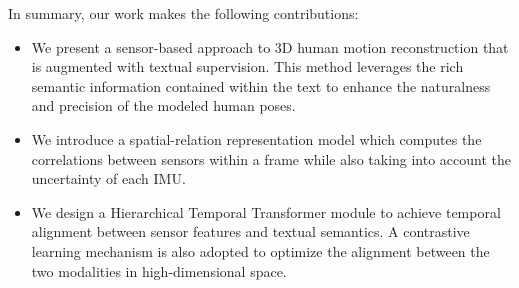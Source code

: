 \documentclass[letterpaper]{article} %
\begin{document}
In summary, our work makes the following contributions:
\begin{itemize}
\item We present a sensor-based approach to 3D human motion reconstruction that is augmented with textual supervision. This method leverages the rich semantic information contained within the text to enhance the naturalness and precision of the modeled human poses.
\item
We introduce a spatial-relation representation model which computes the correlations between sensors within a frame while also taking into account the uncertainty of each IMU.
\item
We design a Hierarchical Temporal Transformer module to achieve temporal alignment between sensor features and textual semantics. A contrastive learning mechanism is also adopted to optimize the alignment between the two modalities in high-dimensional space.
\end{itemize}

\end{document}
